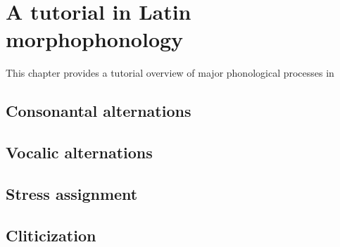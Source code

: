\chapter{A tutorial in Latin morphophonology}

This chapter provides a tutorial overview of major phonological processes in 

\section{Consonantal alternations}

\section{Vocalic alternations}

\section{Stress assignment}

\section{Cliticization}
